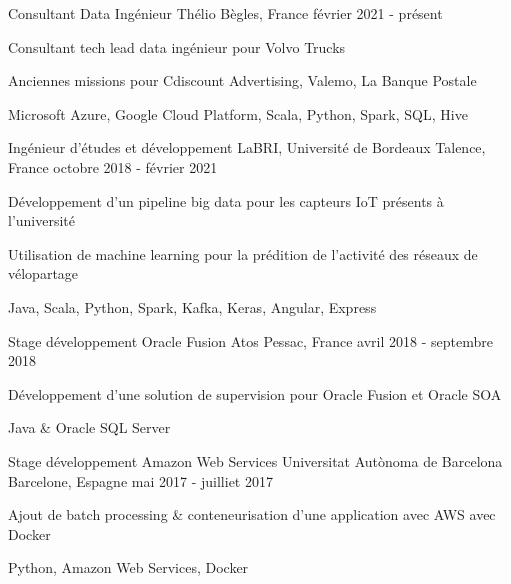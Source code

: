 
\begin{cventries}
	\cventry
	{Consultant Data Ingénieur}
	{Thélio}
	{Bègles, France}
	{février 2021 - présent}
	{
		\begin{cvitems}
			\item {Consultant tech lead data ingénieur pour Volvo Trucks}
			\item {Anciennes missions pour Cdiscount Advertising, Valemo, La Banque Postale}
			\item {Microsoft Azure, Google Cloud Platform, Scala, Python, Spark, SQL, Hive}
		\end{cvitems}
	}
	
	\cventry
	{Ingénieur d'études et développement}
	{LaBRI, Université de Bordeaux}
	{Talence, France}
	{octobre 2018 - février 2021}
	{
		\begin{cvitems}
			\item {Développement d'un pipeline big data pour les capteurs IoT présents à l'université}
			\item {Utilisation de machine learning pour la prédition de l'activité des réseaux de vélopartage}
			\item {Java, Scala, Python, Spark, Kafka, Keras, Angular, Express}
		\end{cvitems}
	}
	
	\cventry
	{Stage développement Oracle Fusion}
	{Atos}
	{Pessac, France}
	{avril 2018 - septembre 2018}
	{
		\begin{cvitems}
			\item {Développement d'une solution de supervision pour Oracle Fusion et Oracle SOA}
			\item {Java \& Oracle SQL Server}
		\end{cvitems}
	}
	
	\cventry
	{Stage développement Amazon Web Services}
	{Universitat Autònoma de Barcelona}
	{Barcelone, Espagne}
	{mai 2017 - juilliet 2017}
	{
		\begin{cvitems}
			\item {Ajout de batch processing \& conteneurisation d'une application avec AWS avec Docker}
			\item {Python, Amazon Web Services, Docker}
		\end{cvitems}
	}

\end{cventries}